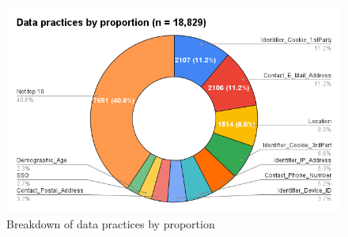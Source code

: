 
\begin{figure}[!ht]
	\centering
	\includegraphics[width=1\textwidth]{figures/eda_data_practices.png}      
    \caption{Breakdown of data practices by proportion}
    \label{fig:eda_data_practice}
\end{figure}

